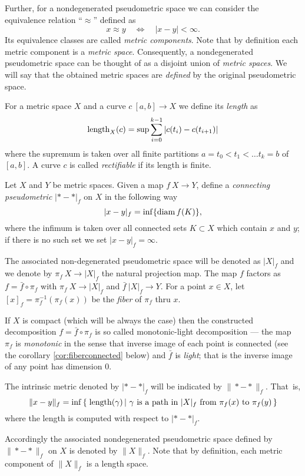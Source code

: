 \documentclass{article}
\begin{document}
Further, for a nondegenerated pseudometric space we can consider the equivalence relation ``$\approx$'' defined as 
\[x\approx y\quad\iff\quad|x-y|<\infty.\]
Its equivalence classes are called \emph{metric components}.
Note that by definition each metric component is a \emph{metric space}.
Consequently, a nondegenerated pseudometric space can be thought of as a disjoint union of \emph{metric spaces}.
We will say that the obtained metric spaces are \emph{defined} by the  original pseudometric space.%

For a metric space $X$ and a curve $c\:[a,b]\to X$ we define its {\em length} as
\[\mathop{\rm length}\nolimits_X(c)=\sup\sum_{i=0}^{k-1} |c(t_i)-c(t_{i+1})|\]
where the supremum is taken over all finite partitions ${a=t_0<t_1<\ldots t_k=b}$ of $[a,b]$. 
A curve $c$ is called {\em rectifiable} if its length is finite.

Let $X$ and $Y$ be metric spaces.
Given a map $f\:X\to Y$,
define a \emph{connecting pseudometric} $|{*}-{*}|_f$ on $X$ in
the following way
\[|x-y|_f=\inf\{\mathop{\rm diam}\nolimits f(K)\},\]
where the infimum is taken over all connected sets $K\subset X$ which contain $x$ and $y$;
if there is no such set we set $|x-y|_f=\infty$. 

The associated non-degenerated pseudometric space will be
denoted as $|X|_f$ and we denote by $\pi_f\:X\to |X|_f$ the natural projection map.
The map $f$ factors as $f=\bar f\circ \pi_f$ with $\pi_f\:X\to|X|_f$ and $\bar f\:|X|_f\to Y$.
For a point $x\in X$, let $[x]_f=\pi_f^{-1}(\pi_f(x))$ be the \emph{fiber} of $\pi_f$ thru $x$.

If $X$ is compact (which will be always the case)
then the constructed decomposition $f=\bar f\circ \pi_f$ is so called monotonic-light decomposition --- the map $\pi_f$ is \emph{monotonic}
in the sense that inverse image of each point is connected (see the corollary \ref{cor:fiberconnected} below)
and $\bar f$ is \emph{light}; 
that is the inverse image of any point has dimension $0$.

The intrinsic metric denoted by $|{*}-{*}|_f$ will be indicated by 
$\|{*}-{*}\|_f$. 
That~is, 
\[\|x-y\|_f
=
\inf
\set{\length(\gamma)}{\gamma\ \text{is a path in}\ |X|_f\ \text{from}\ \pi_f(x) \ \text{to}\ \pi_f(y)}\]
where the length is computed with respect to $|{*}-{*}|_f$. 

Accordingly the associated nondegenerated  pseudometric space defined by $\|{*}-{*}\|_f$ on $X$ 
is denoted by $\|X\|_f$. 
Note that by definition, each metric component of $\|X\|_f$ is a length space.
\end{document}
